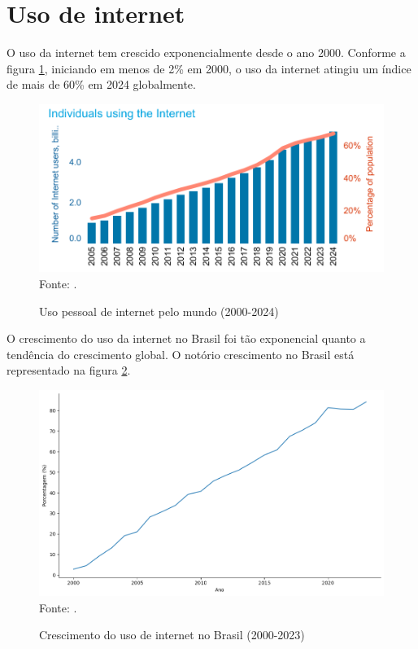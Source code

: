 \section{Uso de internet}
\label{uso_internet}

O uso da internet tem crescido exponencialmente desde o ano 2000. Conforme a figura \ref{fig:individuals_using_internet_itu}, iniciando em menos de 2\% em 2000, o uso da internet atingiu um índice de mais de 60\% em 2024 globalmente. 

\begin{figure}[H]
    \centering
    \caption{Uso pessoal de internet pelo mundo (2000-2024)}
    \includegraphics[width=0.78\linewidth]{figuras/internet/individuos_uso_internet_itu.png}
    \label{fig:individuals_using_internet_itu}
    \\ \footnotesize{Fonte: \cite{ITU_uso_internet_mundo}.}
\end{figure}

O crescimento do uso da internet no Brasil foi tão exponencial quanto a tendência do crescimento global. O notório crescimento no Brasil está representado na figura \ref{fig:crescimento_internet_brasil_itu}.

\begin{figure}[H]
    \centering
    \caption{Crescimento do uso de internet no Brasil (2000-2023)}
    \includegraphics[width=1\linewidth]{figuras/internet/lineplot_uso_internet_brasil_itu.png}
    \label{fig:crescimento_internet_brasil_itu}
    \footnotesize{Fonte: \cite{ITU_crescimento_uso_internet_brasil}.}
\end{figure}

